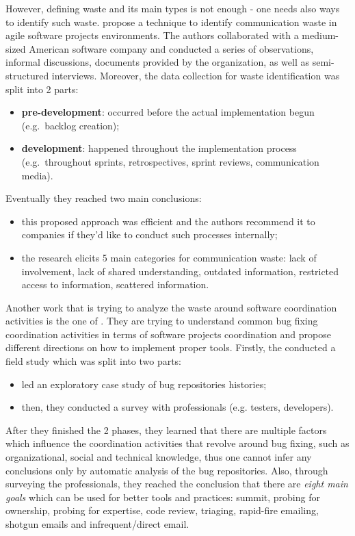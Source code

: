 \documentclass{mprop}
\begin{document}
However, defining waste and its main types is not enough - one needs also
ways to identify such waste. \citet{Korkala2014WasteIdentification} propose a
technique to identify communication waste in agile software projects 
environments. The authors collaborated with a medium-sized American software 
company and conducted a series of observations, informal discussions, documents 
provided by the organization, as well as semi-structured interviews. Moreover,
the data collection for waste identification was split into 2 parts:
  \begin{itemize}
    \item \textbf{pre-development}: occurred before the actual implementation
      begun (e.g.\ backlog creation);
    \item \textbf{development}: happened throughout the implementation
      process (e.g.\ throughout sprints, retrospectives, sprint reviews,
      communication media).
  \end{itemize}
Eventually they reached two main conclusions:
  \begin{itemize}
    \item this proposed approach was efficient and the authors recommend it to
      companies if they'd like to conduct such processes internally;
    \item the research elicits 5 main categories for communication waste: lack
      of involvement, lack of shared understanding, outdated information, 
      restricted access to information, scattered information.
  \end{itemize}

Another work that is trying to analyze the waste around software coordination activities
is the one of \citet{aranda2009secret}. They are trying to understand common bug fixing
coordination activities in terms of software projects coordination and propose different
directions on how to implement proper tools. Firstly, the conducted a field study which was
split into two parts:
  \begin{itemize}
    \item led an exploratory case study of bug repositories histories;
    \item then, they conducted a survey with professionals (e.g. testers, developers).
  \end{itemize}
After they finished the 2 phases, they learned that there are multiple factors which
influence the coordination activities that revolve around bug fixing, such as organizational,
social and technical knowledge, thus one cannot infer any conclusions only by automatic analysis 
of the bug repositories. Also, through surveying the professionals, they reached the conclusion
that there are \emph{eight main goals} which can be used for better tools and practices: summit, 
probing for ownership, probing for expertise, code review, triaging, rapid-fire emailing, 
shotgun emails and infrequent/direct email.
\end{document}
